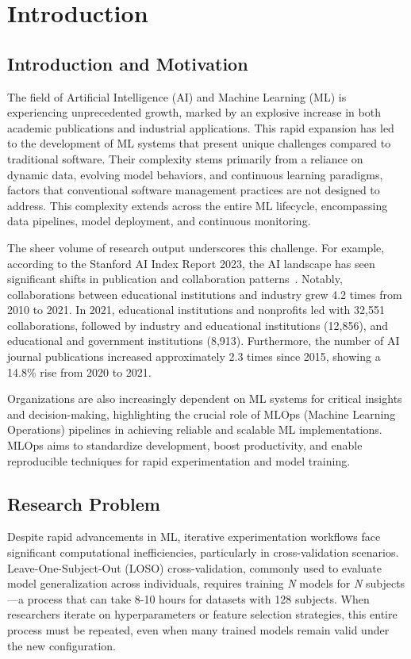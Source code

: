 \documentclass{imc-inf} %
\begin{document}
\chapter{Introduction}

\section{Introduction and Motivation}
The field of Artificial Intelligence (AI) and Machine Learning (ML) is experiencing unprecedented growth, marked by an explosive increase in both academic publications and industrial applications. This rapid expansion has led to the development of ML systems that present unique challenges compared to traditional software. Their complexity stems primarily from a reliance on dynamic data, evolving model behaviors, and continuous learning paradigms, factors that conventional software management practices are not designed to address. This complexity extends across the entire ML lifecycle, encompassing data pipelines, model deployment, and continuous monitoring.

The sheer volume of research output underscores this challenge. For example, according to the Stanford AI Index Report 2023, the AI landscape has seen significant shifts in publication and collaboration patterns~\cite{AIIndex2023}. Notably, collaborations between educational institutions and industry grew 4.2 times from 2010 to 2021. In 2021, educational institutions and nonprofits led with 32,551 collaborations, followed by industry and educational institutions (12,856), and educational and government institutions (8,913). Furthermore, the number of AI journal publications increased approximately 2.3 times since 2015, showing a 14.8\% rise from 2020 to 2021.

Organizations are also increasingly dependent on ML systems for critical insights and decision-making, highlighting the crucial role of MLOps (Machine Learning Operations) pipelines in achieving reliable and scalable ML implementations. MLOps aims to standardize development, boost productivity, and enable reproducible techniques for rapid experimentation and model training.

\section{Research Problem}

Despite rapid advancements in ML, iterative experimentation workflows face significant computational inefficiencies, particularly in cross-validation scenarios. Leave-One-Subject-Out (LOSO) cross-validation, commonly used to evaluate model generalization across individuals, requires training \textit{N} models for \textit{N} subjects—a process that can take 8-10 hours for datasets with 128 subjects. When researchers iterate on hyperparameters or feature selection strategies, this entire process must be repeated, even when many trained models remain valid under the new configuration.
\end{document}

